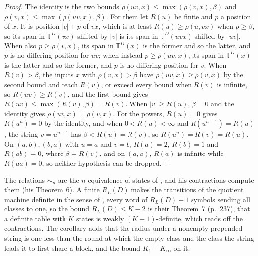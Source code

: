 \documentclass[11pt,a4paper]{article}
\theoremstyle{definition}
\theoremstyle{plain}
\newcommand{\T}{\mathbb{T}}
\newcommand{\ripple}{R_{L}}
\begin{document}
\begin{proof}
The identity is the two bounds \(\rho(uv, x) \le \max(\rho(v, x), \beta)\) and
\(\rho(v, x) \le \max(\rho(uv, x), \beta)\). For them let \(R(u)\) be finite and \(p\) a position of \(x\). It is
position \(|v| + p\) of \(vx\), which is at least \(R(u) \ge \rho(u, vx)\) when \(p \ge \beta\), so its span in
\(\T^D(vx)\) shifted by \(|v|\) is its span in \(\T^D(uvx)\) shifted by \(|uv|\). When also \(p \ge \rho(v, x)\), its
span in \(\T^D(x)\) is the former and so the latter, and \(p\) is no differing position for \(uv\); when instead
\(p \ge \rho(uv, x)\), its span in \(\T^D(x)\) is the latter and so the former, and \(p\) is no differing position for
\(v\). When \(R(v) > \beta\), the inputs \(x\) with \(\rho(v, x) > \beta\) have \(\rho(uv, x) \ge \rho(v, x)\) by the
second bound and reach \(R(v)\), or exceed every bound when \(R(v)\) is infinite, so \(R(uv) \ge R(v)\), and the first
bound gives \(R(uv) \le \max(R(v), \beta) = R(v)\). When \(|v| \ge R(u)\), \(\beta = 0\) and the identity gives
\(\rho(uv, x) = \rho(v, x)\). For the powers, \(R(u) = 0\) gives \(R(u^n) = 0\) by the identity, and when
\(0 < R(u) < \infty\) and \(R(u^{n-1}) = R(u)\), the string \(v = u^{n-1}\) has \(\beta < R(u) = R(v)\), so
\(R(u^n) = R(v) = R(u)\). On \((a, b), (b, a)\) with \(u = a\) and \(v = b\), \(R(a) = 2\), \(R(b) = 1\) and
\(R(ab) = 0\), where \(\beta = R(v)\), and on \((a, a)\), \(R(a)\) is infinite while \(R(aa) = 0\), so neither
hypothesis can be dropped.
\end{proof}

The relations \(\sim_n\) are the \(n\)-equivalence of states of \citet[Section~2.3, Definition~2]{steinby1969definite},
and his contractions compute them (his Theorem~6). A finite \(\ripple(D)\) makes the transitions of the quotient machine
definite in the sense of \citet{perles1963definite}, every word of \(\ripple(D) + 1\) symbols sending all classes to
one, so the bound \(\ripple(D) \le K - 2\) is their Theorem~7 (p.~237), that a definite table with \(K\) states is
weakly \((K - 1)\)-definite, which \citet[Corollary~6.3]{steinby1969definite} reads off the contractions. The corollary
adds that the radius under a nonempty prepended string is one less than the round at which the empty class and the class
the string leads it to first share a block, and the bound \(K_1 - K_\infty\) on it.
\end{document}
